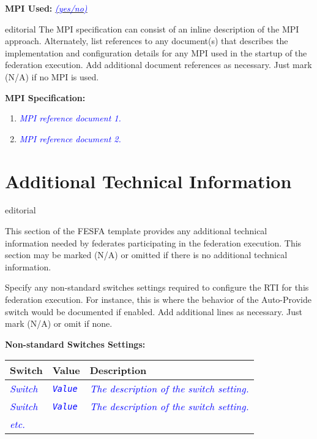 \documentclass[11pt,english,letterpaper]{article}
\newcommand{\example}[1]{{\textcolor{blue}{\textit{#1}}}}
\begin{document}
\textbf{MPI Used: } \underline{\example{(yes/no)}}

\begin{shownto}{editorial}
{\color{red} The MPI specification can consist of an inline description of the
MPI approach. Alternately, list references to any document(s) that describes
the implementation and configuration details for any MPI used in the startup of
the federation execution. Add additional document references as necessary. Just
mark (N/A) if no MPI is used.}
\end{shownto}

\textbf{MPI Specification: }
\begin{enumerate}
\item \example{MPI reference document 1.}
\item \example{MPI reference document 2.}
\end{enumerate}


\section*{Additional Technical Information}

\begin{shownto}{editorial}
{\color{red} This section of the FESFA template provides any additional
technical information needed by federates participating in the federation
execution. This section may be marked (N/A) or omitted if there is no
additional technical information.

Specify any non-standard switches settings required to configure the RTI for
this federation execution. For instance, this is where the behavior of the
Auto-Provide switch would be documented if enabled. Add additional lines as
necessary. Just mark (N/A) or omit if none.}
\end{shownto}

\textbf{Non-standard Switches Settings: }

\begin{tabularx}{\textwidth}{|l|l|X|} \hline
\textbf{Switch} & \textbf{Value} & \textbf{Description} \\ \hline
\example{Switch} & \example{\texttt{Value}} &
\example{The description of the switch setting.} \\ \hline
\example{Switch} & \example{\texttt{Value}} &
\example{The description of the switch setting.} \\ \hline
\example{etc.} &  & \\ \hline
\end{tabularx}
\end{document}
